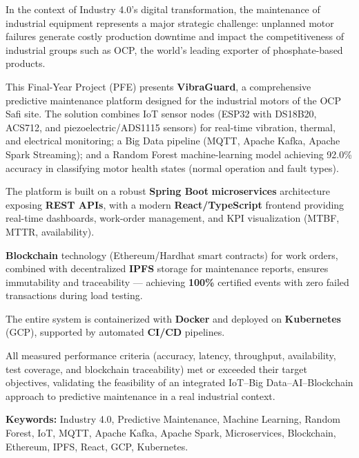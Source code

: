 \documentclass[12pt, a4paper, oneside]{report}
\newcommand{\projectname}{\textbf{VibraGuard}}
\newcommand{\kw}[1]{\textbf{#1}}
\begin{document}
\vspace{0.5em}
In the context of Industry 4.0's digital transformation, the maintenance of
industrial equipment represents a major strategic challenge: unplanned motor
failures generate costly production downtime and impact the competitiveness of
industrial groups such as OCP, the world's leading exporter of phosphate-based
products.

This Final-Year Project (PFE) presents \projectname{}, a comprehensive predictive
maintenance platform designed for the industrial motors of the OCP Safi site. The
solution combines IoT sensor nodes (ESP32 with DS18B20, ACS712, and
piezoelectric/ADS1115 sensors) for real-time vibration, thermal, and electrical
monitoring; a Big Data pipeline (MQTT, Apache Kafka, Apache Spark Streaming); and a Random Forest machine-learning model achieving 92.0\% accuracy in
classifying motor health states (normal operation and fault types).

The platform is built on a robust \kw{Spring Boot} \kw{microservices} architecture  exposing \kw{REST APIs}, with a modern \kw{React/TypeScript} frontend providing real-time dashboards, work-order management, and KPI visualization (MTBF, MTTR,  availability). 

\kw{Blockchain} technology (Ethereum/Hardhat smart contracts) for work orders, combined with decentralized \kw{IPFS} storage for maintenance reports, ensures  immutability and traceability — achieving  \textbf{100\%} certified events with zero failed transactions during load testing.

The entire system is containerized with \kw{Docker} and deployed on  \kw{Kubernetes} (GCP), supported by automated \kw{CI/CD} pipelines.

All measured performance criteria (accuracy, latency, throughput, availability,
test coverage, and blockchain traceability) met or exceeded their target objectives,
validating the feasibility of an integrated IoT--Big Data--AI--Blockchain approach
to predictive maintenance in a real industrial context.

\vspace{0.5em}
\noindent\textbf{Keywords:} Industry 4.0, Predictive Maintenance, Machine Learning,
Random Forest, IoT, MQTT, Apache Kafka, Apache Spark, Microservices, Blockchain,
Ethereum, IPFS, React, GCP, Kubernetes.

\newpage

\tableofcontents
\newpage
\listoftables
{}
\newpage
\listoffigures
{}
\newpage
\end{document}
